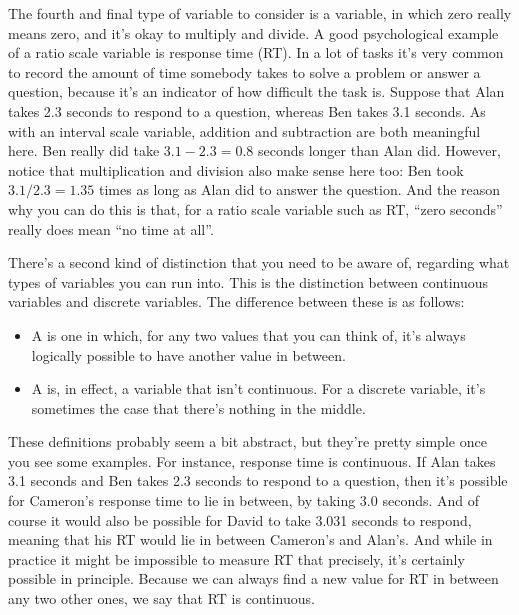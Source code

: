 
The fourth and final type of variable to consider is a  variable, in which zero really means zero, and it's okay to multiply and divide. A good psychological example of a ratio scale variable is response time (RT). In a lot of tasks it's very common to record the amount of time somebody takes to solve a problem or answer a question, because it's an indicator of how difficult the task is. Suppose that Alan takes 2.3 seconds to respond to a question, whereas Ben takes 3.1 seconds. As with an interval scale variable, addition and subtraction are both meaningful here. Ben really did take $3.1 - 2.3 = 0.8$ seconds longer than Alan did. However, notice that multiplication and division also make sense here too: Ben took $3.1 / 2.3 = 1.35$ times as long as Alan did to answer the question. And the reason why you can do this is that, for a ratio scale variable such as RT, ``zero seconds'' really does mean ``no time at all''.


There's a second kind of distinction that you need to be aware of, regarding what types of variables you can run into. This is the distinction between continuous variables and discrete variables. The difference between these is as follows:

\begin{itemize}
\item A  is one in which, for any two values that you can think of, it's always logically possible to have another value in between. 
\item A  is, in effect, a variable that isn't continuous. For a discrete variable, it's sometimes the case that there's nothing in the middle.
\end{itemize}

These definitions probably seem a bit abstract, but they're pretty simple once you see some examples. For instance, response time is continuous. If Alan takes 3.1 seconds and Ben takes 2.3 seconds to respond to a question, then   it's possible for Cameron's response time to lie in between, by taking 3.0 seconds. And of course it would also be possible for David to take 3.031 seconds to respond, meaning that his RT would lie in between Cameron's and Alan's. And while in practice it might be impossible to measure RT that precisely, it's certainly possible in principle. Because we can always find a new value for RT in between any two other ones, we say that RT is continuous.  

